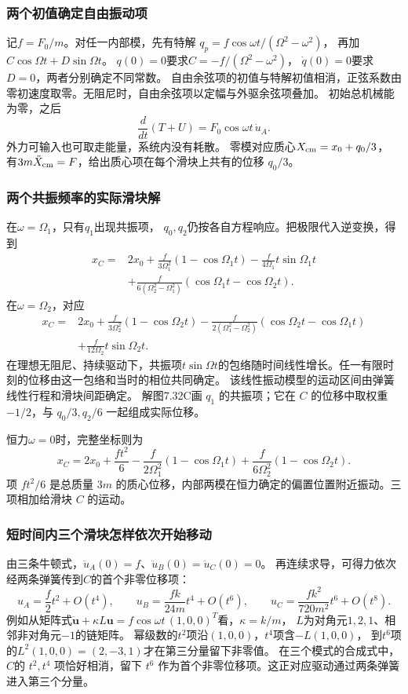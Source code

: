 \documentclass[UTF8,fontset=fandol,a4paper,11pt]{ctexart}
\begin{document}
\subsubsection*{两个初值确定自由振动项}
记$f=F_0/m$。对任一内部模，先有特解
$q_p=f\cos\omega t/(\Omega^2-\omega^2)$，
再加$C\cos\Omega t+D\sin\Omega t$。
$q(0)=0$要求$C=-f/(\Omega^2-\omega^2)$，
$\dot q(0)=0$要求$D=0$，两者分别确定不同常数。
自由余弦项的初值与特解初值相消，正弦系数由零初速度取零。无阻尼时，自由余弦项以定幅与外驱余弦项叠加。
初始总机械能为零，之后
\[
\frac{d}{dt}(T+U)=F_0\cos\omega t\,\dot u_A.
\]
外力可输入也可取走能量，系统内没有耗散。
零模对应质心$X_{\rm cm}=x_0+q_0/3$，
有$3m\ddot X_{\rm cm}=F$，给出质心项在每个滑块上共有的位移 $q_0/3$。

\subsubsection*{两个共振频率的实际滑块解}
在$\omega=\Omega_1$，只有$q_1$出现共振项，
$q_0,q_2$仍按各自方程响应。把极限代入逆变换，得到
\[
\begin{aligned}
x_C={}&2x_0+\frac f{3\Omega_1^2}(1-\cos\Omega_1t)
-\frac f{4\Omega_1}t\sin\Omega_1t\\
&+\frac f{6(\Omega_2^2-\Omega_1^2)}
(\cos\Omega_1t-\cos\Omega_2t).
\end{aligned}
\]
在$\omega=\Omega_2$，对应
\[
\begin{aligned}
x_C={}&2x_0+\frac f{3\Omega_2^2}(1-\cos\Omega_2t)
-\frac f{2(\Omega_1^2-\Omega_2^2)}
(\cos\Omega_2t-\cos\Omega_1t)\\
&+\frac f{12\Omega_2}t\sin\Omega_2t.
\end{aligned}
\]
在理想无阻尼、持续驱动下，共振项$t\sin\Omega t$的包络随时间线性增长。任一有限时刻的位移由这一包络和当时的相位共同确定。
该线性振动模型的运动区间由弹簧线性行程和滑块间距确定。
解图7.32C画 $q_1$ 的共振项；它在 $C$ 的位移中取权重 $-1/2$，与 $q_0/3,q_2/6$ 一起组成实际位移。

恒力$\omega=0$时，完整坐标则为
\[
x_C=2x_0+\frac{ft^2}{6}
-\frac f{2\Omega_1^2}(1-\cos\Omega_1t)
+\frac f{6\Omega_2^2}(1-\cos\Omega_2t).
\]
项 $ft^2/6$ 是总质量 $3m$ 的质心位移，内部两模在恒力确定的偏置位置附近振动。三项相加给滑块 $C$ 的运动。

\subsubsection*{短时间内三个滑块怎样依次开始移动}
由三条牛顿式，$\ddot u_A(0)=f$、$\ddot u_B(0)=\ddot u_C(0)=0$。
再连续求导，可得力依次经两条弹簧传到$C$的首个非零位移项：
\[
u_A=\frac f2t^2+O(t^4),\qquad
u_B=\frac{fk}{24m}t^4+O(t^6),\qquad
u_C=\frac{fk^2}{720m^2}t^6+O(t^8).
\]
例如从矩阵式$\ddot{\boldsymbol u}+\kappa L\boldsymbol u
=f\cos\omega t\,(1,0,0)^T$看，$\kappa=k/m$，
$L$为对角元$1,2,1$、相邻非对角元$-1$的链矩阵。
幂级数的$t^2$项沿$(1,0,0)$，$t^4$项含$-L(1,0,0)$，
到$t^6$项的$L^2(1,0,0)=(2,-3,1)$才在第三分量留下非零值。
在三个模式的合成式中，$C$的 $t^2,t^4$ 项恰好相消，留下 $t^6$ 作为首个非零位移项。这正对应驱动通过两条弹簧进入第三个分量。
\end{document}
